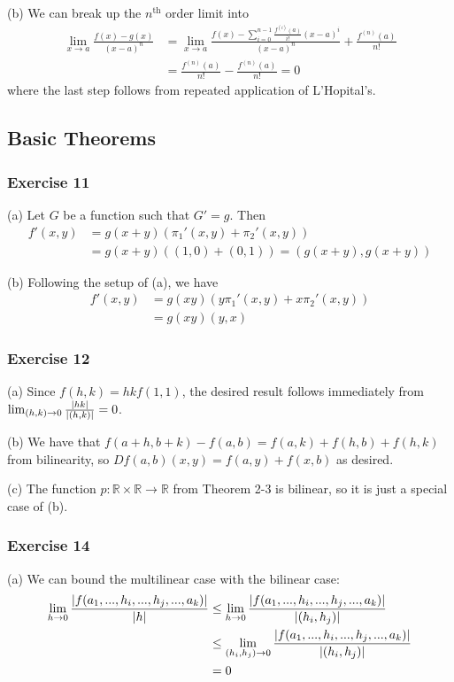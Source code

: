 (b) We can break up the $n^{\text{th}}$ order limit into
\begin{align*}
        \lim_{x \to  a} \frac{f(x) - g(x)}{(x - a)^n} &=
        \lim_{x \to a} \frac{f(x) - \sum_{i = 0}^{n - 1} \frac{f^{(i)}(a)}{i!} (x - a)^i}{(x - a)^n} +
        \frac{f^{(n)}(a)}{n!} \\
                                                      &= \frac{f^{(n)}(a)}{n!} - \frac{f^{(n)}(a)}{n!} = 0
\end{align*}
where the last step follows from repeated application of L'Hopital's.

\subsection{Basic Theorems}

\subsubsection{Exercise 11}
(a) Let $G$ be a function such that $G' = g$. Then
\begin{align*}
        f'(x, y) &= g(x + y) (\pi_1'(x, y) + \pi_2'(x, y)) \\
                 &= g(x + y) ((1, 0) + (0, 1)) = (g(x + y), g(x + y))
\end{align*}

(b) Following the setup of (a), we have
\begin{align*}
        f'(x, y) &= g(xy) (y \pi_1'(x, y) + x \pi_2'(x, y)) \\
                 &= g(xy) (y, x)
\end{align*}

\subsubsection{Exercise 12}
(a) Since $f(h, k) = hk f(1, 1)$, the desired result follows immediately from $\lim_{(h, k) \to 0} \frac{\abs{hk}}{\abs{(h, k)}} = 0$.

(b) We have that $f(a + h, b + k) - f(a, b) = f(a, k) + f(h, b) + f(h, k)$ from bilinearity, so $Df(a, b)(x, y) = f(a, y) + f(x, b)$ as
desired.

(c) The function $p: \mathbb{R} \times \mathbb{R} \to \mathbb{R}$ from Theorem 2-3 is bilinear, so it is just a special case
of (b).

\subsubsection{Exercise 14}
(a) We can bound the multilinear case with the bilinear case:
\begin{align*}
        \lim_{h \to 0} \frac{\abs{f(a_1, ..., h_i, ..., h_j, ..., a_k)}}{\abs{h}} &\leq
        \lim_{h \to 0} \frac{\abs{f(a_1, ..., h_i, ..., h_j, ..., a_k)}}{\abs{(h_i, h_j)}} \\ &\leq
        \lim_{(h_i, h_j) \to 0} \frac{\abs{f(a_1, ..., h_i, ..., h_j, ..., a_k)}}{\abs{(h_i, h_j)}} \\
                                                                                             &= 0
\end{align*}

